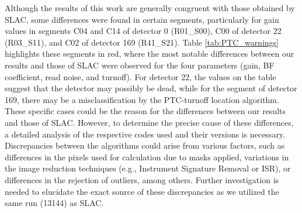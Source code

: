 Although the results of this work are generally congruent with those obtained by SLAC, some differences were found in certain segments, particularly for gain values in segments C04 and C14 of detector 0 (R01\_S00), C00 of detector 22 (R03\_S11), and C02 of detector 169 (R41\_S21). Table \ref{tab:PTC_warnings} highlights these segments in red, where the most notable differences between our results and those of SLAC were observed for the four parameters (gain, BF coefficient, read noise, and turnoff). For detector 22, the values on the table suggest that the detector may possibly be dead, while for the segment of detector 169, there may be a misclassification by the PTC-turnoff location algorithm. These specific cases could be the reason for the differences between our results and those of SLAC. However, to determine the precise cause of these differences, a detailed analysis of the respective codes used and their versions is necessary. Discrepancies between the algorithms could arise from various factors, such as differences in the pixels used for calculation due to masks applied, variations in the image reduction techniques (e.g., Instrument Signature Removal or ISR), or differences in the rejection of outliers, among others. Further investigation is needed to elucidate the exact source of these discrepancies as we utilized the same run (13144) as SLAC.

\vspace{3mm}


